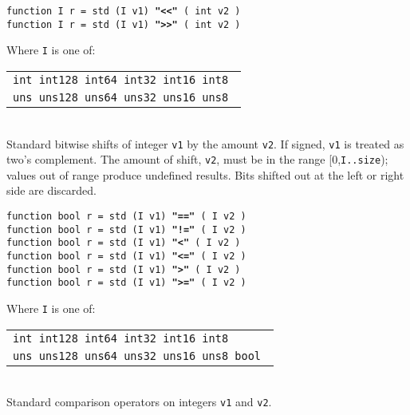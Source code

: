 \documentclass[12pt]{article}
\newcommand{\ttkey}[1]{{\tt \bfseries #1}}
\newenvironment{indpar}[1][0.3in]%
	{\begin{list}{}%
		     {\setlength{\itemsep}{0in}%
		      \setlength{\topsep}{0in}%
		      \setlength{\parsep}{1ex}%
		      \setlength{\labelwidth}{#1}%
		      \setlength{\leftmargin}{#1}%
		      \addtolength{\leftmargin}{\labelsep}}%
	 \item}%
	{\end{list}}
\begin{document}
{\tt function I r = std (I v1) \ttkey{"<{}<"} ( int v2 )} \\
{\tt function I r = std (I v1) \ttkey{">{}>"} ( int v2 )}
\begin{indpar}
Where {\tt I} is one of:
	\begin{tabular}[t]{l}
	\tt int  int128 int64  int32  int16 int8 \\
	\tt uns  uns128 uns64  uns32  uns16 uns8 \\
	\end{tabular}
\\[1ex]
Standard bitwise shifts of integer {\tt v1} by the amount {\tt v2}.
If signed, {\tt v1} is treated as two's complement.
The amount of shift, {\tt v2}, must be in the range
[0,{\tt I..size}); values out of range produce undefined results.
Bits shifted out at the left or
right side are discarded.
\end{indpar}

{\tt function bool r = std (I v1) \ttkey{"=="} ( I v2 )} \\
{\tt function bool r = std (I v1) \ttkey{"!="} ( I v2 )} \\
{\tt function bool r = std (I v1) \ttkey{"<"} ( I v2 )} \\
{\tt function bool r = std (I v1) \ttkey{"<="} ( I v2 )} \\
{\tt function bool r = std (I v1) \ttkey{">"} ( I v2 )} \\
{\tt function bool r = std (I v1) \ttkey{">="} ( I v2 )}
\begin{indpar}
Where {\tt I} is one of:
	\begin{tabular}[t]{l}
	\tt int  int128 int64  int32  int16 int8 \\
	\tt uns  uns128 uns64  uns32  uns16 uns8 bool \\
	\end{tabular}
\\[1ex]
Standard comparison operators on integers {\tt v1} and {\tt v2}.
\end{indpar}
	
\end{document}
